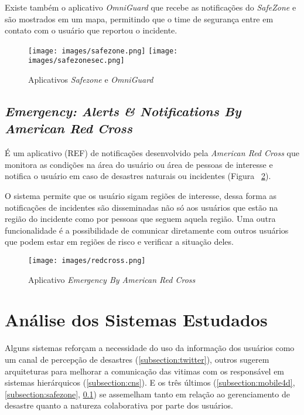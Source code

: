 \documentclass[	12pt, Times, openright, twoside, a4paper, english, brazil]{abntex2}
\begin{document}
Existe também o aplicativo \textit{OmniGuard} que recebe as notificações do \textit{SafeZone} e são mostrados em um mapa, permitindo que o time de segurança entre em contato com o usuário que reportou o incidente. 

\begin{figure}[h]
\centering %
\texttt{[image: images/safezone.png]} %
\texttt{[image: images/safezonesec.png]} %
\caption{Aplicativos \textit{Safezone} e \textit{OmniGuard}}
\label{fig:Safezone}
\end{figure}

\subsection{\textit{Emergency: Alerts & Notifications By American Red Cross}}
\label{subsection:redcross}
É um aplicativo (REF) de notificações desenvolvido pela \textit{American Red Cross} que monitora as condições na área do usuário ou área de pessoas de interesse e notifica o usuário em caso de desastres naturais ou incidentes  (Figura ~\ref{fig:RedCross}).

O sistema permite que os usuário sigam regiões de interesse, dessa forma as notificações de incidentes são disseminadas não só aos usuários que estão na região do incidente como por pessoas que seguem aquela região. Uma outra funcionalidade é a possibilidade de comunicar diretamente com outros usuários que podem estar em regiões de risco e verificar a situação deles.

\begin{figure}[h]
\centering %
\texttt{[image: images/redcross.png]} %
\caption{Aplicativo \textit{Emergency By American Red Cross}}
\label{fig:RedCross}
\end{figure}

\section{Análise dos Sistemas Estudados}
\label{section:analisesistemas}
Alguns sistemas reforçam a necessidade do uso da informação dos usuários como um canal de percepção de desastres (\ref{subsection:twitter}), outros sugerem arquiteturas para melhorar a comunicação das vitimas com os responsável em sistemas hierárquicos (\ref{subsection:cns}). E os três últimos (\ref{subsection:mobile4d}, \ref{subsection:safezone}, \ref{subsection:redcross}) se assemelham tanto em relação ao gerenciamento de desastre quanto a natureza colaborativa por parte dos usuários.
\end{document}
